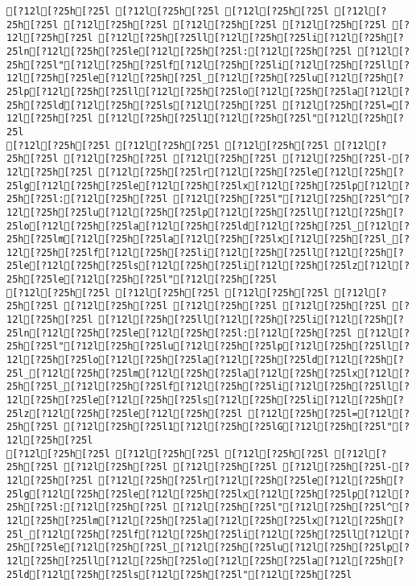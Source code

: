 \documentclass{scrartcl}
\begin{document}
\begin{Verbatim}
[?12l[?25h[?25l [?12l[?25h[?25l [?12l[?25h[?25l [?12l[?25h[?25l [?12l[?25h[?25l [?12l[?25h[?25l [?12l[?25h[?25l [?12l[?25h[?25l [?12l[?25h[?25ll[?12l[?25h[?25li[?12l[?25h[?25ln[?12l[?25h[?25le[?12l[?25h[?25l:[?12l[?25h[?25l [?12l[?25h[?25l"[?12l[?25h[?25lf[?12l[?25h[?25li[?12l[?25h[?25ll[?12l[?25h[?25le[?12l[?25h[?25l_[?12l[?25h[?25lu[?12l[?25h[?25lp[?12l[?25h[?25ll[?12l[?25h[?25lo[?12l[?25h[?25la[?12l[?25h[?25ld[?12l[?25h[?25ls[?12l[?25h[?25l [?12l[?25h[?25l=[?12l[?25h[?25l [?12l[?25h[?25l1[?12l[?25h[?25l"[?12l[?25h[?25l
[?12l[?25h[?25l [?12l[?25h[?25l [?12l[?25h[?25l [?12l[?25h[?25l [?12l[?25h[?25l [?12l[?25h[?25l [?12l[?25h[?25l-[?12l[?25h[?25l [?12l[?25h[?25lr[?12l[?25h[?25le[?12l[?25h[?25lg[?12l[?25h[?25le[?12l[?25h[?25lx[?12l[?25h[?25lp[?12l[?25h[?25l:[?12l[?25h[?25l [?12l[?25h[?25l"[?12l[?25h[?25l^[?12l[?25h[?25lu[?12l[?25h[?25lp[?12l[?25h[?25ll[?12l[?25h[?25lo[?12l[?25h[?25la[?12l[?25h[?25ld[?12l[?25h[?25l_[?12l[?25h[?25lm[?12l[?25h[?25la[?12l[?25h[?25lx[?12l[?25h[?25l_[?12l[?25h[?25lf[?12l[?25h[?25li[?12l[?25h[?25ll[?12l[?25h[?25le[?12l[?25h[?25ls[?12l[?25h[?25li[?12l[?25h[?25lz[?12l[?25h[?25le[?12l[?25h[?25l"[?12l[?25h[?25l
[?12l[?25h[?25l [?12l[?25h[?25l [?12l[?25h[?25l [?12l[?25h[?25l [?12l[?25h[?25l [?12l[?25h[?25l [?12l[?25h[?25l [?12l[?25h[?25l [?12l[?25h[?25ll[?12l[?25h[?25li[?12l[?25h[?25ln[?12l[?25h[?25le[?12l[?25h[?25l:[?12l[?25h[?25l [?12l[?25h[?25l"[?12l[?25h[?25lu[?12l[?25h[?25lp[?12l[?25h[?25ll[?12l[?25h[?25lo[?12l[?25h[?25la[?12l[?25h[?25ld[?12l[?25h[?25l_[?12l[?25h[?25lm[?12l[?25h[?25la[?12l[?25h[?25lx[?12l[?25h[?25l_[?12l[?25h[?25lf[?12l[?25h[?25li[?12l[?25h[?25ll[?12l[?25h[?25le[?12l[?25h[?25ls[?12l[?25h[?25li[?12l[?25h[?25lz[?12l[?25h[?25le[?12l[?25h[?25l [?12l[?25h[?25l=[?12l[?25h[?25l [?12l[?25h[?25l1[?12l[?25h[?25lG[?12l[?25h[?25l"[?12l[?25h[?25l
[?12l[?25h[?25l [?12l[?25h[?25l [?12l[?25h[?25l [?12l[?25h[?25l [?12l[?25h[?25l [?12l[?25h[?25l [?12l[?25h[?25l-[?12l[?25h[?25l [?12l[?25h[?25lr[?12l[?25h[?25le[?12l[?25h[?25lg[?12l[?25h[?25le[?12l[?25h[?25lx[?12l[?25h[?25lp[?12l[?25h[?25l:[?12l[?25h[?25l [?12l[?25h[?25l"[?12l[?25h[?25l^[?12l[?25h[?25lm[?12l[?25h[?25la[?12l[?25h[?25lx[?12l[?25h[?25l_[?12l[?25h[?25lf[?12l[?25h[?25li[?12l[?25h[?25ll[?12l[?25h[?25le[?12l[?25h[?25l_[?12l[?25h[?25lu[?12l[?25h[?25lp[?12l[?25h[?25ll[?12l[?25h[?25lo[?12l[?25h[?25la[?12l[?25h[?25ld[?12l[?25h[?25ls[?12l[?25h[?25l"[?12l[?25h[?25l

\end{Verbatim}
\end{document}
